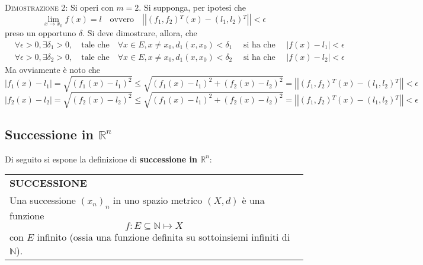 \documentclass[a4paper]{extarticle}
\renewcommand\arraystretch{}
\begin{document}
\vspace{2em}
\noindent
\normalfont \normalsize
\textsc{Dimostrazione 2}: Si operi con $m=2$. Si supponga, per ipotesi che
\[\lim_{x \to x_0} f(x) = l \hspace{1em} \text{ovvero} \hspace{1em} \left \vert \left \vert (f_1,f_2){^T}(x) - (l_1,l_2){^T} \right \vert \right \vert < \epsilon\]
preso un opportuno $\delta$. Si deve dimostrare, allora, che
\begin{align*}
    &\forall \epsilon>0, \exists \delta_1 > 0, \hspace{1em} \text{tale che} \hspace{1em} \forall x \in E, x \neq x_0, d_1(x,x_0) < \delta_1 \hspace{1em} \text{ si ha che } \hspace{1em} \left \vert f(x) - l_1 \right \vert < \epsilon\\
    &\forall \epsilon>0, \exists \delta_2 > 0, \hspace{1em} \text{tale che} \hspace{1em} \forall x \in E, x \neq x_0, d_1(x,x_0) < \delta_2 \hspace{1em} \text{ si ha che } \hspace{1em} \left \vert f(x) - l_2 \right \vert < \epsilon
\end{align*}
Ma ovviamente è noto che
\[\left \vert f_1(x) - l_1 \right \vert = \sqrt{(f_1(x)-l_1)^2} \leq \sqrt{(f_1(x)-l_1)^2+(f_2(x)-l_2)^2} = \left \vert \left \vert (f_1,f_2){^T}(x) - (l_1,l_2){^T} \right \vert \right \vert < \epsilon\]
\[\left \vert f_2(x) - l_2 \right \vert = \sqrt{(f_2(x)-l_2)^2} \leq \sqrt{(f_1(x)-l_1)^2+(f_2(x)-l_2)^2} = \left \vert \left \vert (f_1,f_2){^T}(x) - (l_1,l_2){^T} \right \vert \right \vert < \epsilon\]

\vspace{1em}
\noindent
\subsection{Successione in $\mathbb{R}^n$}
Di seguito si espone la definizione di \textbf{successione in $\mathbb{R}^n$}:

\vspace{1em}
\setlength{\tabcolsep}{14pt}
\renewcommand{\arraystretch}{2}
\noindent
\begin{tabularx}{\textwidth}{@{}|P|@{}}
    \hline
    {\textbf{SUCCESSIONE}}\\
    \parbox{\linewidth}{Una successione $(x_n)_n$ in uno spazio metrico $(X,d)$ è una funzione
    \[f : E \subseteq \mathbb{N} \longmapsto X\]
    con $E$ infinito (ossia una funzione definita su sottoinsiemi infiniti di $\mathbb{N}$).
    \vspace{3mm}}\\
    \hline
\end{tabularx}
\end{document}
